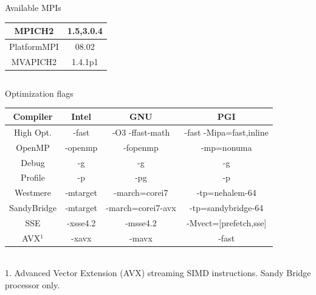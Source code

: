 \documentclass[final,t]{beamer}
\begin{document}
\begin{frame}[fragile]{}
\begin{columns}[t]
\begin{column}{.32\linewidth}
\begin{columns}[t]
\begin{column}{.35\linewidth}
\begin{block}{Available MPIs}
\begin{center}
\begin{tabular}{|c|c|}
      \hline 
      MPICH2 & 1.5,3.0.4  \\ 
      \hline 
      PlatformMPI & 08.02  \\ 
      \hline 
      MVAPICH2 & 1.4.1p1  \\ 
      \hline 
      \end{tabular} 
      \end{center}
        \vspace*{-2ex}
      \end{block}
      \end{column}
  \end{columns}

 
      \begin{block}{Optimization flags}
        \vspace*{-2ex}
           \begin{center}
           \begin{tabular}{|c|c|c|c|}
           \hline 
           \textbf{Compiler} & \textbf{Intel} & \textbf{GNU} & \textbf{PGI} \\ 
           \hline 
           High Opt. & -fast & -O3 -ffast-math & -fast -Mipa=fast,inline \\ 
           \hline 
           OpenMP & -openmp & -fopenmp & -mp=nonuma \\ 
           \hline 
           Debug & -g & -g & -g \\ 
           \hline 
           Profile & -p & -pg & -p \\ 
           \hline 
           Westmere & -mtarget & -march=corei7  & -tp=nehalem-64 \\ 
           \hline 
           SandyBridge & -mtarget & -march=corei7-avx  & -tp=sandybridge-64 \\ 
           \hline 
           SSE & -xsse4.2 & -msse4.2 & -Mvect=[prefetch,sse] \\ 
           \hline 
           AVX$^1$ & -xavx & -mavx & -fast \\ 
           \hline 
           \end{tabular} 
           \begin{footnotesize}
            \\1. Advanced Vector Extension (AVX) streaming SIMD instructions. Sandy Bridge processor only.
           \end{footnotesize}
           \end{center}
        \vspace*{-2ex}
      \end{block}
     

\end{column}
\end{columns}
\end{frame}
\end{document}

